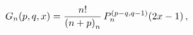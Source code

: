 \[\mathop{G_{n}\/}\nolimits\!\left(p,q,x\right)=\frac{n!}{\left(n+p\right)_{n}}%
\mathop{P^{(p-q,q-1)}_{n}\/}\nolimits\!\left(2x-1\right),\]